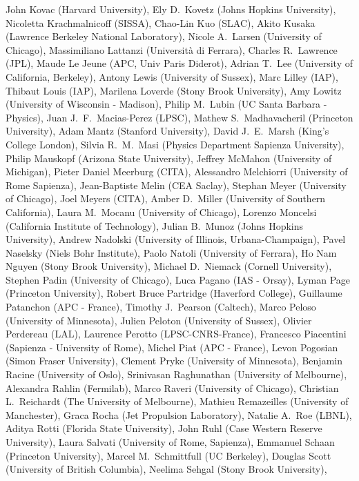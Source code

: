 John Kovac (Harvard University),
Ely D.~Kovetz (Johns Hopkins University),
Nicoletta Krachmalnicoff (SISSA),
Chao-Lin Kuo (SLAC),
Akito Kusaka (Lawrence Berkeley National Laboratory),
Nicole A.~Larsen (University of Chicago),
Massimiliano Lattanzi (Università di Ferrara),
Charles R.~Lawrence (JPL),
Maude Le Jeune (APC, Univ Paris Diderot),
Adrian T.~Lee (University of California, Berkeley),
Antony Lewis (University of Sussex),
Marc Lilley (IAP),
Thibaut Louis (IAP),
Marilena Loverde (Stony Brook University),
Amy Lowitz (University of Wisconsin - Madison),
Philip M.~Lubin (UC Santa Barbara - Physics),
Juan J.~F.~Macias-Perez (LPSC),
Mathew S.~Madhavacheril (Princeton University),
Adam Mantz (Stanford University),
David J.~E.~Marsh (King's College London),
Silvia R.~M.~Masi (Physics Department Sapienza University),
Philip Mauskopf (Arizona State University),
Jeffrey McMahon (University of Michigan),
Pieter Daniel Meerburg (CITA),
Alessandro Melchiorri (University of Rome Sapienza),
Jean-Baptiste Melin (CEA Saclay),
Stephan Meyer (University of Chicago),
Joel Meyers (CITA),
Amber D.~Miller (University of Southern California),
Laura M.~Mocanu (University of Chicago),
Lorenzo Moncelsi (California Institute of Technology),
Julian B.~Munoz (Johns Hopkins University),
Andrew Nadolski (University of Illinois, Urbana-Champaign),
Pavel Naselsky (Niels Bohr Institute),
Paolo Natoli (University of Ferrara),
Ho Nam Nguyen (Stony Brook University),
Michael D.~Niemack (Cornell University),
Stephen Padin (University of Chicago),
Luca Pagano (IAS - Orsay),
Lyman Page (Princeton University),
Robert Bruce Partridge (Haverford College),
Guillaume Patanchon (APC - France),
Timothy J.~Pearson (Caltech),
Marco Peloso (University of Minnesota),
Julien Peloton (University of Sussex),
Olivier Perdereau (LAL),
Laurence Perotto (LPSC-CNRS-France),
Francesco Piacentini (Sapienza - University of Rome),
Michel Piat (APC - France),
Levon Pogosian (Simon Fraser University),
Clement Pryke (University of Minnesota),
Benjamin Racine (University of Oslo),
Srinivasan Raghunathan (University of Melbourne),
Alexandra Rahlin (Fermilab),
Marco Raveri (University of Chicago),
Christian L.~Reichardt (The University of Melbourne),
Mathieu Remazeilles (University of Manchester),
Graca Rocha (Jet Propulsion Laboratory),
Natalie A.~Roe (LBNL),
Aditya Rotti (Florida State University),
John Ruhl (Case Western Reserve University),
Laura Salvati (University of Rome, Sapienza),
Emmanuel Schaan (Princeton University),
Marcel M.~Schmittfull (UC Berkeley),
Douglas Scott (University of British Columbia),
Neelima Sehgal (Stony Brook University),
